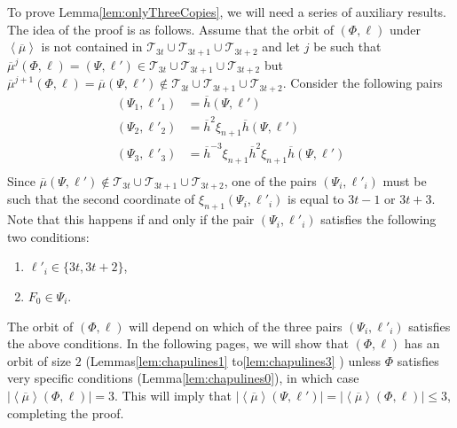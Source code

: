 \documentclass[final]{amsart}
\theoremstyle{plain}
\theoremstyle{definition}
\theoremstyle{remark}
\numberwithin{equation}{section}
\renewcommand{\leq}{\leqslant} \renewcommand{\geq}{\geqslant}
\renewcommand{\{}{\lbrace}
\renewcommand{\}}{\rbrace}
\renewcommand{\bar}{\overline}
\newcommand{\cT}{\mathcal{T}}
\newcommand{\kng}{{h}}
\newcommand{\etab}{\bar{\kng}}
\newcommand{\mub}{\bar{\mu}}
\newcommand{\te}{\xi}
\begin{document}
To prove Lemma\nobreakspace \ref {lem:onlyThreeCopies}, we will need a series of auxiliary results. The idea of the proof is as follows. Assume that the orbit of $(\Phi,\ell)$ under $\left\langle \mub \right\rangle $ is not contained in $\cT_{3t} \cup \cT_{3t+1} \cup \cT_{3t+2}$ and let $j$ be such that $\mub^{j}(\Phi, \ell) = (\Psi,\ell') \in \cT_{3t} \cup \cT_{3t+1} \cup \cT_{3t+2}$ but $\mub^{j+1}(\Phi,\ell) = \mub(\Psi,\ell') \not \in \cT_{3t} \cup \cT_{3t+1} \cup \cT_{3t+2}$.
Consider the following pairs
\[\begin{aligned}
	(\Psi_{1}, \ell'_{1}) &= \etab(\Psi,\ell') \\
	(\Psi_{2}, \ell'_{2}) &= \etab^{2}\te_{n+1}\etab(\Psi,\ell') \\
	(\Psi_{3}, \ell'_{3}) &= \etab^{-3}\te_{n+1}\etab^{2}\te_{n+1}\etab(\Psi,\ell') \\
\end{aligned}\]
Since $\mub(\Psi,\ell') \not \in \cT_{3t} \cup \cT_{3t+1} \cup \cT_{3t+2}$, one of the pairs $(\Psi_{i}, \ell'_{i})$ must be such that the second coordinate of $\te_{n+1}(\Psi_{i}, \ell'_{i})$ is equal to $3t-1$ or $3t+3$. Note that this happens if and only if  the pair $(\Psi_{i}, \ell'_{i})$ satisfies the following two conditions:
\begin{enumerate}
    \item $\ell'_{i}\in\{3t,3t+2\}$,
    \item $F_{0} \in \Psi_{i}$.
\end{enumerate}
The orbit of $(\Phi, \ell)$  will depend on which of the three pairs $(\Psi_{i}, \ell'_{i})$ satisfies the above conditions. 
In the following pages, we will show that $(\Phi,\ell)$ 
has an orbit of size $2$ (Lemmas\nobreakspace  \ref {lem:chapulines1} to\nobreakspace  \ref {lem:chapulines3} ) unless $\Phi$ satisfies very specific conditions (Lemma\nobreakspace \ref {lem:chapulines0}), in which case $\left|   \left\langle \mub \right\rangle (\Phi, \ell) \right| = 3$. 
This will imply that  $\left|   \left\langle \mub \right\rangle (\Psi, \ell') \right|  =  \left|   \left\langle \mub \right\rangle (\Phi, \ell) \right| \leq 3$, completing the proof.
\end{document}
